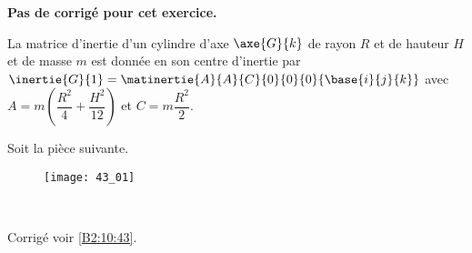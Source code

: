 \normaltrue \difficilefalse \tdifficilefalse
\correctionfalse


\setcounter{numques}{0}
\ifcorrection
\else
\textbf{Pas de corrigé pour cet exercice.}
\fi




\ifprof
\else
La matrice d'inertie d'un cylindre d'axe $\axe{G}{k}$ de rayon $R$ et de hauteur $H$ et de masse $m$ est donnée en son centre d'inertie par 
$\inertie{G}{1}=\matinertie{A}{A}{C}{0}{0}{0}{\base{i}{j}{k}}$ avec $A=m\left(\dfrac{R^2}{4}+\dfrac{H^2}{12} \right)$ et $C=m\dfrac{R^2}{2}$. 

Soit la pièce suivante. 
\begin{figure}[H]
\centering
\texttt{[image: 43\_01]}
\end{figure}
\fi


\ifprof
\else
\fi

\ifprof ~\\
\else
\fi


\ifprof
\else
\begin{flushright}
\footnotesize{Corrigé voir \ref{B2:10:43}.}
\end{flushright}%
\fi